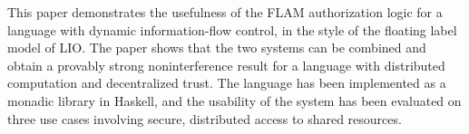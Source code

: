 This paper demonstrates the usefulness of the FLAM authorization logic for a language with dynamic information-flow control, in the style of the floating label model of LIO. The paper shows that the two systems can be combined and obtain a provably strong noninterference result for a language with distributed computation and decentralized trust. The language has been implemented as a monadic library in Haskell, and the usability of the system has been evaluated on three use cases involving secure, distributed access to shared resources.